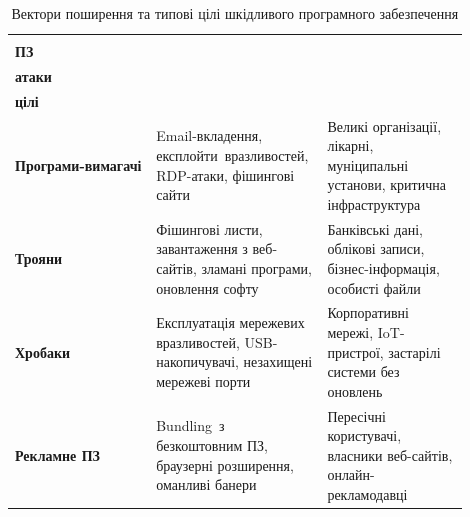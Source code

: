 \begin{table}[H]
    \centering
    \footnotesize
    \caption{Вектори поширення та типові цілі шкідливого програмного забезпечення}
    \label{tab:table6_2}
    \renewcommand{\arraystretch}{1.05}
    \begin{tabular}{|>{\raggedright\arraybackslash}p{0.30\linewidth}|>{\raggedright\arraybackslash}p{0.30\linewidth}|>{\raggedright\arraybackslash}p{0.30\linewidth}|}
        \hline
        \multicolumn{1}{|c|}{\shortstack{\textbf{Вид шкідливого} \\ \textbf{ПЗ}}} & \multicolumn{1}{c|}{\shortstack{\textbf{Основні вектори} \\ \textbf{атаки}}} & \multicolumn{1}{c|}{\shortstack{\textbf{Типові} \\ \textbf{цілі}}} \\
        \hline
        \textbf{Програми-вимагачі} & Email-вкладення, експлойти\footnotemark[3]\ вразливостей, RDP-атаки\footnotemark[4], фішингові сайти & Великі організації, лікарні, муніципальні установи, критична інфраструктура \\
        \hline
        \textbf{Трояни} & Фішингові листи, завантаження з веб-сайтів, зламані програми, оновлення софту & Банківські дані, облікові записи, бізнес-інформація, особисті файли \\
        \hline
        \textbf{Хробаки} & Експлуатація мережевих вразливостей, USB-накопичувачі, незахищені мережеві порти & Корпоративні мережі, IoT-пристрої, застарілі системи без оновлень \\
        \hline
        \textbf{Рекламне ПЗ} & Bundling\footnotemark[5]\ з безкоштовним ПЗ, браузерні розширення, оманливі банери & Пересічні користувачі, власники веб-сайтів, онлайн-рекламодавці \\
        \hline
    \end{tabular}
\end{table}

